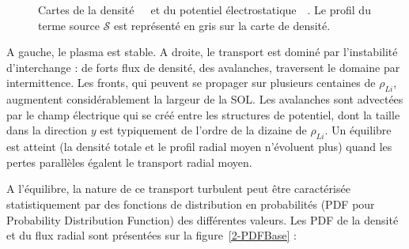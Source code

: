 \begin{refsection}
\begin{figure}[!htbp]
    \centering
    \caption{Cartes de la densité~~~et du potentiel
    électrostatique~~. Le profil du terme source
    $\mathcal{S}$ est représenté en gris sur la carte de densité.
    }
    \label{2-CartesBase}
\end{figure}

A gauche, le plasma est stable. A droite, le transport est dominé par l'instabilité d'interchange : de
forts flux de densité, des avalanches, traversent le domaine par intermittence.
Les fronts, qui peuvent se propager sur plusieurs centaines de
$\rho_{Li}$, augmentent considérablement la largeur de la SOL.
Les avalanches sont advectées par le champ électrique qui se créé entre les
structures de potentiel, dont la taille dans la direction $y$ est
typiquement de l'ordre de la dizaine de $\rho_{Li}$.
Un équilibre est atteint (la densité totale et le profil radial moyen
n'évoluent plus) quand les pertes parallèles égalent le transport radial moyen.

A l'équilibre, la nature de ce transport turbulent peut être
caractérisée statistiquement par des fonctions de distribution en probabilités
(PDF pour Probability Distribution Function) des différentes valeurs. Les PDF
de la densité et du flux radial sont présentées sur la figure~\ref{2-PDFBase} : 


\end{refsection}

